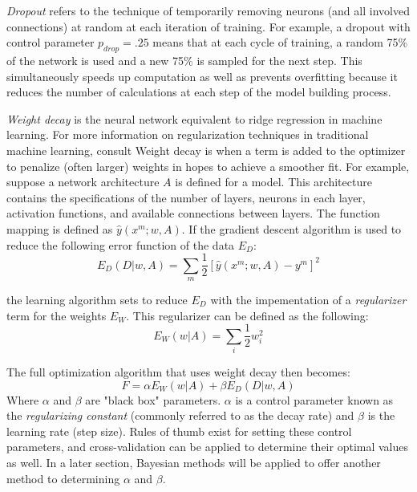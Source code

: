 \textit{Dropout} refers to the technique of temporarily removing neurons (and all involved connections) at random  at each iteration of training.\cite{srivastava2014dropout}  For example, a dropout with control parameter $p_{drop} = .25$ means that at each cycle of training, a random 75\% of the network is used and a new 75\% is sampled for the next step. This simultaneously speeds up computation as well as prevents overfitting because it reduces the number of calculations at each step of the model building process.

\textit{Weight decay} is the neural network equivalent to ridge regression in machine learning.  For more information on regularization techniques in traditional machine learning, consult \cite{Goodfellow-et-al-2016}  Weight decay is when a  term is added to the optimizer to penalize (often larger) weights in hopes to achieve a smoother fit. \cite{mackay1992practical}  For example, suppose a network architecture $A$ is defined for a model.  This architecture contains the specifications of the number of layers, neurons in each layer, activation functions, and available connections between layers.  The function mapping is defined as $\hat{y}(x^m;w,A)$.  If the gradient descent algorithm is used to reduce the following error function of the data $E_D$:
$$
E_D(D|w,A) = \sum_m \frac{1}{2} [\hat{y}(x^m;w,A) - y^m]^2
$$

the learning algorithm sets to reduce $E_D$ with the impementation of a \textit{regularizer} term for the weights $E_W$.  This regularizer can be defined as the following:
$$
E_W(w|A) = \sum_i \frac{1}{2} w_i^2
$$

The full optimization algorithm that uses weight decay then becomes:
$$
F = \alpha E_W(w|A) + \beta E_D(D|w,A)
$$
Where $\alpha$ and $\beta$ are "black box" parameters. \cite{mackay1992practical}  $\alpha$ is a control parameter known as the \textit{regularizing constant} (commonly referred to as the decay rate) and $\beta$ is the learning rate (step size).  Rules of thumb exist for setting these control parameters, and cross-validation can be applied to determine their optimal values as well.  In a later section, Bayesian methods will be applied to offer another method to determining $\alpha$ and $\beta$.

